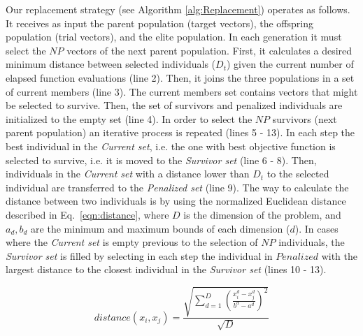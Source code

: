 Our replacement strategy (see Algorithm \ref{alg:Replacement}) operates as follows.
%
It receives as input the parent population (target vectors), the offspring population (trial vectors), and the elite population.
%
In each generation it must select the $NP$ vectors of the next parent population.
%
First, it calculates a desired minimum distance between selected individuals ($D_t$) given the current number of elapsed function evaluations (line 2).
%
Then, it joins the three populations in a set of current members (line 3).
%
The current members set contains vectors that might be selected to survive.
%
Then, the set of survivors and penalized individuals are initialized to the empty set (line 4).
%
In order to select the $NP$ survivors (next parent population) an iterative process is repeated (lines 5 - 13).
%
In each step the best individual in the \textit{Current set}, i.e. the one with best objective function is selected
to survive, i.e. it is moved to the \textit{Survivor set} (line 6 - 8).
%
Then, individuals in the \textit{Current set} with a distance lower than $D_t$ to the selected individual are transferred to the \textit{Penalized set} (line 9).
%
The way to calculate the distance between two individuals is by using the normalized Euclidean distance described in Eq.~\ref{eqn:distance}, where $D$ is the dimension of the problem, and $a_d, b_d$ are the minimum and maximum bounds of each dimension ($d$).
%
%
In cases where the \textit{Current set} is empty previous to the selection of $NP$ individuals, the \textit{Survivor set} is filled by selecting in each step 
the individual in $Penalized$ with the largest distance to the closest individual in the \textit{Survivor set} (lines 10 - 13).

\begin{equation}\label{eqn:distance}
distance ( x_{i}, x_j ) = \frac{\sqrt{ \sum_{d=1}^D \left ( \frac{x_{i}^d - x_j^d}{b^d - a^d} \right )^2  }} {\sqrt{D}}
\end{equation}


